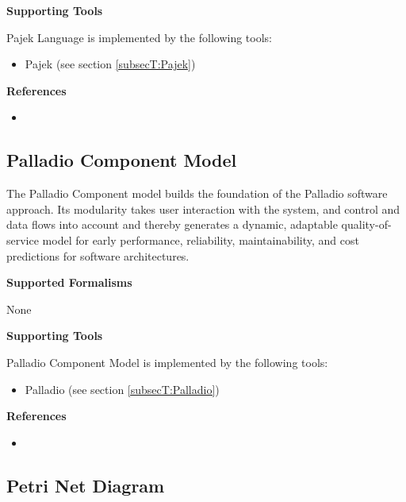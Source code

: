 \textbf{Supporting Tools}

Pajek Language is implemented by the following tools:
\begin{itemize}
	\item Pajek (see section \ref{subsecT:Pajek})
\end{itemize}


\textbf{References}
\begin{itemize}
	
\item {}
\end{itemize}



\subsection{Palladio Component Model}
\label{subsecL:PalladioComponentModel}


The Palladio Component model builds the foundation of the Palladio software approach. Its modularity takes user interaction with the system, and control and data flows into account and thereby generates a dynamic, adaptable quality-of-service model for early performance, reliability, maintainability, and cost predictions for software architectures.

\textbf{Supported Formalisms}

None


\textbf{Supporting Tools}

Palladio Component Model is implemented by the following tools:
\begin{itemize}
	\item Palladio (see section \ref{subsecT:Palladio})
\end{itemize}


\textbf{References}
\begin{itemize}
	
\item {}
\end{itemize}



\subsection{Petri Net Diagram}
\label{subsecL:PetriNetDiagram}


